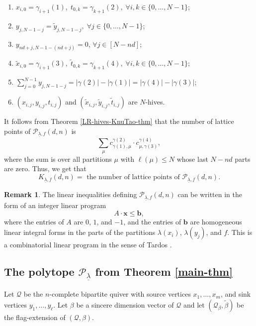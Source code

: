 \documentclass[11pt]{article}
\theoremstyle{definition}
\newtheorem{rema}[theo]{Remark}
\numberwithin{equation}{section}
\newcommand{\p}{\mathcal{P}}
\newcommand{\Q}{\mathbf{\mathcal{Q}}}
\newcommand{\unlm}{\underline{\lambda}}
\newcommand{\lm}{\lambda}
\begin{document}
\begin{enumerate}
\item $x_{i,0} = \gamma_{i+1}(1), \; t_{0,k} = \gamma_{k+1}(2), \; \forall i,k \in \{0,\ldots, N-1\}$;

\item $y_{j,N-1-j} = \widetilde{y}_{j,N-1-j}, \; \forall j \in \{0,\ldots, N-1\}$;

\item $y_{nd+j, N-1-(nd+j)}=0$, $\forall j \in [N-nd]$;

\item $\widetilde{x}_{i,0} = \gamma_{i+1}(3), \; \widetilde{t}_{0,k} = \gamma_{k+1}(4), \; \forall i,k \in \{0,\ldots, N-1\}$;
\item $\sum_{j=0}^{N-1} y_{j, N-1-j} = |\gamma(2)| - |\gamma(1)| = |\gamma(4)|-|\gamma(3)|$;
\item $(x_{i,j},y_{i,j},t_{i,j})$ and $(\widetilde{x}_{i,j}, \widetilde{y}_{i,j}, \widetilde{t}_{i,j})$ are $N$-hives.
\end{enumerate}
It follows from Theorem \ref{LR-hives-KnuTao-thm} that the number of lattice points of $\p_{\unlm, f}(d,n)$ is 
\[
\sum_{\mu} c^{\gamma(2)}_{\gamma(1),\mu} \cdot c^{\gamma(4)}_{\mu,\gamma(3)},
\]
where the sum is over all partitions $\mu$ with $\ell(\mu) \leq N$ whose last $N-nd$ parts are zero. Thus, we get that
\begin{equation}\label{lattice-points-poly-eqn-1}
K_{\unlm, f}(d, n)=\text{~the number of lattice points of~}\p_{\unlm, f}(d,n).
\end{equation}
\begin{rema} \label{comb-linear-program-rmk} The linear inequalities defining $\p_{\unlm, f}(d,n)$ can be written in the form of an  integer linear program
$$
A\cdot \mathbf{x} \leq \mathbf{b},
$$
where the entries of $A$ are $0$, $1$, and $-1$, and the  entries of $\mathbf{b}$ are homogeneous linear integral forms in the parts of the partitions $\lm(x_i)$, $\lm(y_j)$, and $f$. This is a combinatorial linear program in the sense of Tardos \cite{Tar86}.
\end{rema}

\subsection{The polytope \texorpdfstring{$\p_{\unlm}$}{P\_lambda} from Theorem \ref{main-thm}}\label{our-polytope-sec} Let $\Q$ be the $n$-complete bipartite quiver with source vertices $x_1, \ldots, x_m$, and sink vertices $y_1, \ldots, y_\ell$. Let $\beta$ be a sincere dimension vector of $\Q$ and let $(\Q_\beta, \widetilde{\beta})$ be the flag-extension of $(\Q, \beta)$.
\end{document}
